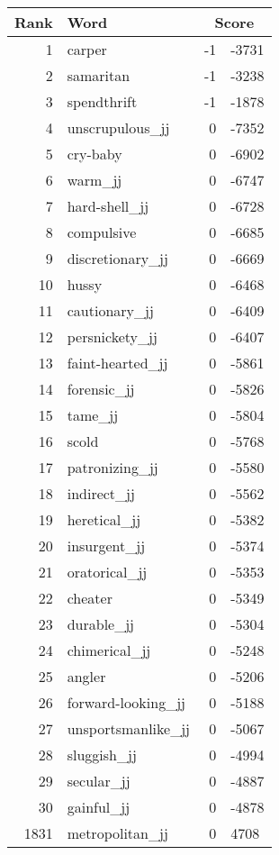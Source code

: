 \begin{longtable}[!htbp]{| rlr@{.}l |}
    \hline
    \textbf{Rank} & \textbf{Word} & \multicolumn{2}{c|}{\textbf{Score}} \\
    \hline
    \endhead
    1 & carper & -1 & -3731 \\
    2 & samaritan & -1 & -3238 \\
    3 & spendthrift & -1 & -1878 \\
    4 & unscrupulous\_jj & 0 & -7352 \\
    5 & cry-baby & 0 & -6902 \\
    6 & warm\_jj & 0 & -6747 \\
    7 & hard-shell\_jj & 0 & -6728 \\
    8 & compulsive & 0 & -6685 \\
    9 & discretionary\_jj & 0 & -6669 \\
    10 & hussy & 0 & -6468 \\
    11 & cautionary\_jj & 0 & -6409 \\
    12 & persnickety\_jj & 0 & -6407 \\
    13 & faint-hearted\_jj & 0 & -5861 \\
    14 & forensic\_jj & 0 & -5826 \\
    15 & tame\_jj & 0 & -5804 \\
    16 & scold & 0 & -5768 \\
    17 & patronizing\_jj & 0 & -5580 \\
    18 & indirect\_jj & 0 & -5562 \\
    19 & heretical\_jj & 0 & -5382 \\
    20 & insurgent\_jj & 0 & -5374 \\
    21 & oratorical\_jj & 0 & -5353 \\
    22 & cheater & 0 & -5349 \\
    23 & durable\_jj & 0 & -5304 \\
    24 & chimerical\_jj & 0 & -5248 \\
    25 & angler & 0 & -5206 \\
    26 & forward-looking\_jj & 0 & -5188 \\
    27 & unsportsmanlike\_jj & 0 & -5067 \\
    28 & sluggish\_jj & 0 & -4994 \\
    29 & secular\_jj & 0 & -4887 \\
    30 & gainful\_jj & 0 & -4878 \\
    1831 & metropolitan\_jj & 0 & 4708 \\

\end{longtable}
